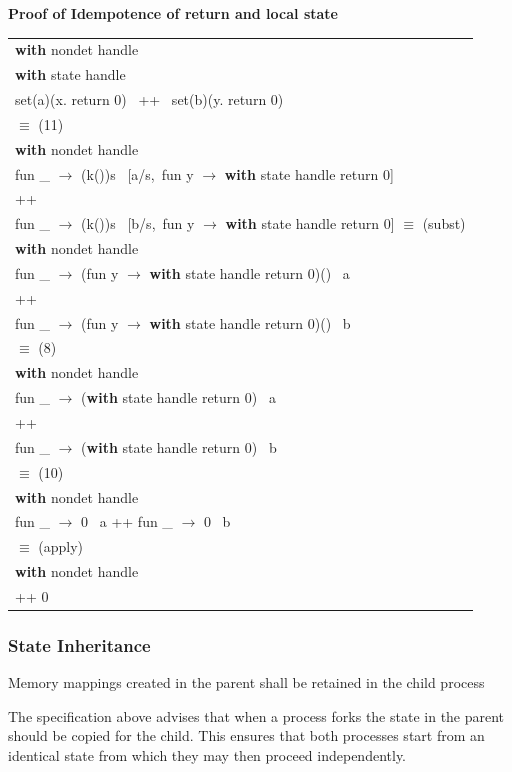 \documentclass[logo,bsc,singlespacing,parskip]{infthesis}
\begin{document}
\vspace{1em}
{\large{\textbf{Proof of Idempotence of return and local state}}}

\normalsize



\begin{longtable}{@{}l@{}}
\textbf{with } nondet handle \\
\quad \textbf{with } state handle \\
\quad\quad set(a)(x. return 0) \, ++ \, set(b)(y. return 0) \\

\quad$\equiv$ (11) \\

\textbf{with } nondet handle \\
\quad fun \_ $\rightarrow$ (k())s \ [a/s,\ fun y $\rightarrow$ \textbf{with } state handle return 0]\\
\quad\quad ++ \\
\quad fun \_ $\rightarrow$ (k())s \ [b/s,\ fun y $\rightarrow$ \textbf{with } state handle return 0] 
\quad$\equiv$ (subst) \\
\textbf{with } nondet handle \\
\quad fun \_ $\rightarrow$ (fun y $\rightarrow$ \textbf{with } state handle return 0)() \ a \\
\quad\quad ++ \\
\quad fun \_ $\rightarrow$ (fun y $\rightarrow$ \textbf{with } state handle return 0)() \ b \\
\quad$\equiv$ (8) \\
\textbf{with } nondet handle \\
\quad fun \_ $\rightarrow$ (\textbf{with } state handle return 0) \ a \\
\quad ++ \\
\quad fun \_ $\rightarrow$ (\textbf{with } state handle return 0) \ b \\
\quad$\equiv$ (10) \\
\textbf{with } nondet handle \\
\quad fun \_ $\rightarrow$ 0 \ a \quad ++ \quad fun \_ $\rightarrow$ 0 \ b \\
\quad$\equiv$ (apply) \\
\textbf{with } nondet handle \\
\quad 0 ++ 0 \\
\end{longtable}


\subsubsection{State Inheritance} 
\begin{tcolorbox}[colback=gray!10, colframe=gray!60, sharp corners, boxrule=0.5pt, title={POSIX Base Specifications, Issue 7, p.897}]
Memory mappings created in the parent shall be retained in the child process
\end{tcolorbox}
The specification above advises that when a process forks the state in the parent should be copied for the child. This ensures that both processes start from an identical state from which they may then proceed independently.
\end{document}
